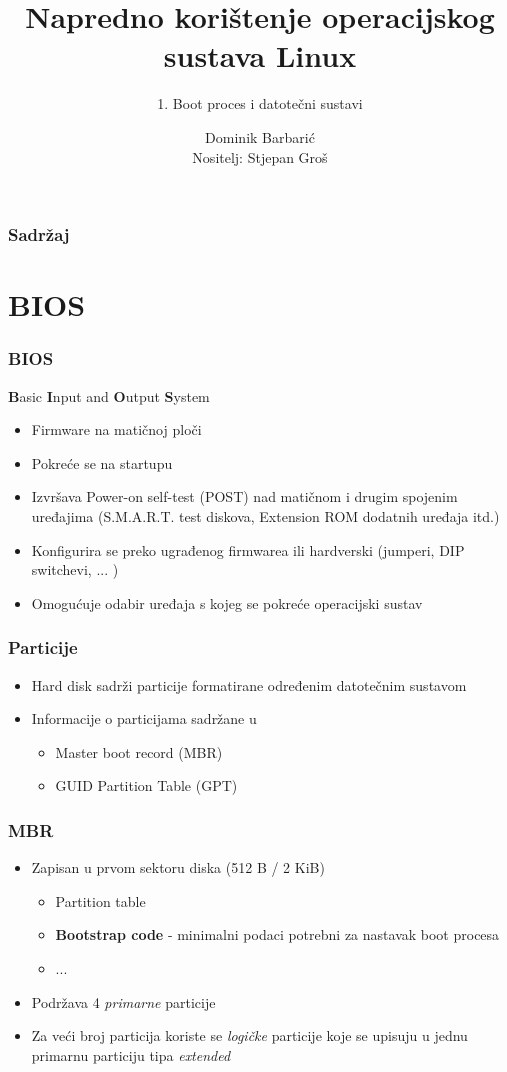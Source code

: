 \documentclass[t]{beamer}
\date{\todayiso}
\title[NKOSL]{Napredno korištenje operacijskog sustava Linux}
\author[Dominik Barbarić]{Dominik Barbarić\\{\small Nositelj: Stjepan Groš}}
\subtitle{1. Boot proces i datotečni sustavi}
\institute[FER]{Sveučilište u Zagrebu\\Fakultet elektrotehnike i računarstva}
\begin{document}
{
	\begin{frame}
		\maketitle
	\end{frame}
}

\begin{frame}
	\frametitle{Sadržaj}
	\tableofcontents
\end{frame}

\section{BIOS}
\begin{frame}
	\frametitle{BIOS}
	\textbf{B}asic \textbf{I}nput and \textbf{O}utput \textbf{S}ystem
	\begin{itemize}
		\item Firmware na matičnoj ploči
		\item Pokreće se na startupu
		\item Izvršava Power-on self-test (POST) nad matičnom i drugim spojenim uređajima (S.M.A.R.T. test diskova, Extension ROM dodatnih uređaja itd.)
		\item Konfigurira se preko ugrađenog firmwarea ili hardverski (jumperi, DIP switchevi, ... )
		\item Omogućuje odabir uređaja s kojeg se pokreće operacijski sustav
	\end{itemize}
\end{frame}

\begin{frame}
	\frametitle{Particije}
	\begin{itemize}
		\item Hard disk sadrži particije formatirane određenim datotečnim sustavom
		\item Informacije o particijama sadržane u
		\begin{itemize}
			\item Master boot record (MBR)
			\item GUID Partition Table (GPT)
		\end{itemize}
	\end{itemize}
\end{frame}	

\begin{frame}
	\frametitle{MBR}
	\begin{itemize}
		\item Zapisan u prvom sektoru diska (512 B / 2 KiB)
		\begin{itemize}
			\item Partition table
			\item \textbf{Bootstrap code} - minimalni podaci potrebni za nastavak boot procesa
			\item ...
		\end{itemize}
		\item Podržava 4 \emph{primarne} particije
		\item Za veći broj particija koriste se \emph{logičke} particije koje se upisuju u jednu primarnu particiju tipa \emph{extended}
	\end{itemize}
\end{frame}
\end{document}
